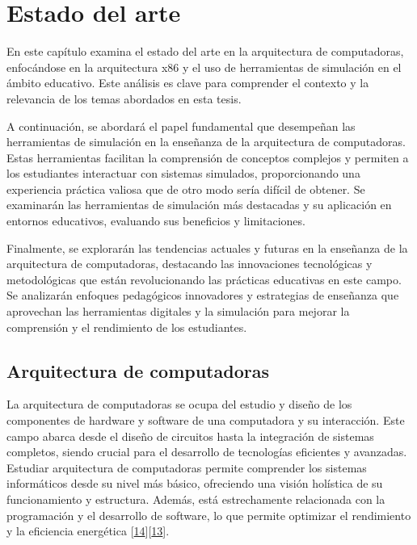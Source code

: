 \documentclass[12pt,twoside]{templates/unerthesis}
\begin{document}
\hypertarget{estado-del-arte}{%
\chapter{Estado del arte}\label{estado-del-arte}}

En este capítulo examina el estado del arte en la arquitectura de computadoras, enfocándose en la arquitectura x86 y el uso de herramientas de simulación en el ámbito educativo. Este análisis es clave para comprender el contexto y la relevancia de los temas abordados en esta tesis.

A continuación, se abordará el papel fundamental que desempeñan las herramientas de simulación en la enseñanza de la arquitectura de computadoras. Estas herramientas facilitan la comprensión de conceptos complejos y permiten a los estudiantes interactuar con sistemas simulados, proporcionando una experiencia práctica valiosa que de otro modo sería difícil de obtener. Se examinarán las herramientas de simulación más destacadas y su aplicación en entornos educativos, evaluando sus beneficios y limitaciones.

Finalmente, se explorarán las tendencias actuales y futuras en la enseñanza de la arquitectura de computadoras, destacando las innovaciones tecnológicas y metodológicas que están revolucionando las prácticas educativas en este campo. Se analizarán enfoques pedagógicos innovadores y estrategias de enseñanza que aprovechan las herramientas digitales y la simulación para mejorar la comprensión y el rendimiento de los estudiantes.

\hypertarget{arquitectura-de-computadoras}{%
\section{Arquitectura de computadoras}\label{arquitectura-de-computadoras}}

La arquitectura de computadoras se ocupa del estudio y diseño de los componentes de hardware y software de una computadora y su interacción. Este campo abarca desde el diseño de circuitos hasta la integración de sistemas completos, siendo crucial para el desarrollo de tecnologías eficientes y avanzadas. Estudiar arquitectura de computadoras permite comprender los sistemas informáticos desde su nivel más básico, ofreciendo una visión holística de su funcionamiento y estructura. Además, está estrechamente relacionada con la programación y el desarrollo de software, lo que permite optimizar el rendimiento y la eficiencia energética {[}\protect\hyperlink{ref-stallings_computer_2013}{14}{]}{[}\protect\hyperlink{ref-hennessy_computer_2012}{13}{]}.
\end{document}
